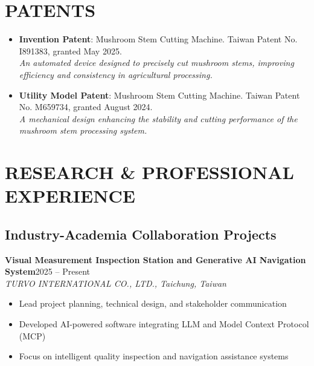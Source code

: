 \documentclass[11pt,a4paper]{article}
\newcommand{\cventry}[4]{
    \noindent\textbf{#1}\hfill#2\\
    \textit{#3}\\
    #4
    \vspace{0.3cm}
}
\begin{document}
\section*{PATENTS}

\begin{itemize}[leftmargin=*, itemsep=6pt]
    \item \textbf{Invention Patent}: Mushroom Stem Cutting Machine. Taiwan Patent No. I891383, granted May 2025.\\
    \textit{An automated device designed to precisely cut mushroom stems, improving efficiency and consistency in agricultural processing.}

    \item \textbf{Utility Model Patent}: Mushroom Stem Cutting Machine. Taiwan Patent No. M659734, granted August 2024.\\
    \textit{A mechanical design enhancing the stability and cutting performance of the mushroom stem processing system.}
\end{itemize}

\section*{RESEARCH \& PROFESSIONAL EXPERIENCE}

\subsection*{Industry-Academia Collaboration Projects}

\cventry{Visual Measurement Inspection Station and Generative AI Navigation System}{2025 -- Present}
{TURVO INTERNATIONAL CO., LTD., Taichung, Taiwan}
{
    \begin{itemize}[leftmargin=*, itemsep=0pt]
        \item Lead project planning, technical design, and stakeholder communication
        \item Developed AI-powered software integrating LLM and Model Context Protocol (MCP)
        \item Focus on intelligent quality inspection and navigation assistance systems
    \end{itemize}
}
\end{document}
